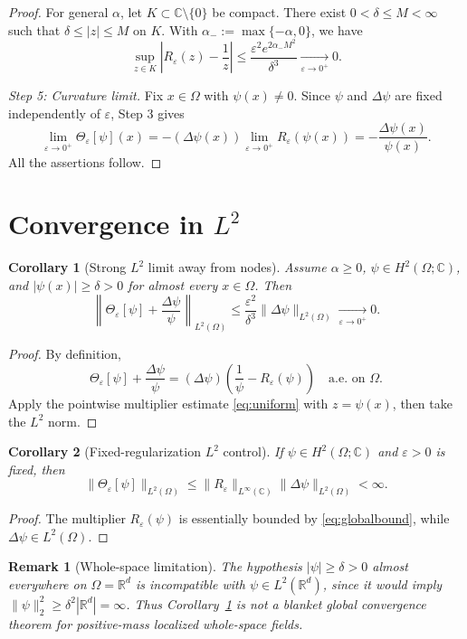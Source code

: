 \documentclass[11pt]{article}
\newtheorem{corollary}{Corollary}
\newtheorem{remark}{Remark}
\newcommand{\C}{\mathbb{C}}
\newcommand{\R}{\mathbb{R}}
\newcommand{\eps}{\varepsilon}
\newcommand{\Reps}{R_{\eps}}
\newcommand{\Thetaeps}{\Theta_{\eps}}
\newcommand{\aMinus}{\alpha_{-}}
\begin{document}
\begin{proof}
For general $\alpha$, let $K\subset\C\setminus\{0\}$ be compact.
There exist $0<\delta\le M<\infty$ such that
$\delta\le|z|\le M$ on $K$. With
$\aMinus:=\max\{-\alpha,0\}$, we have
\[
\sup_{z\in K}
\left|\Reps(z)-\frac1z\right|
\le\frac{\eps^2e^{2\aMinus M^2}}{\delta^3}
\xrightarrow[\eps\to0^+]{}0.
\]

\emph{Step 5: Curvature limit.}
Fix $x\in\Omega$ with $\psi(x)\ne0$. Since $\psi$ and
$\Delta\psi$ are fixed independently of $\eps$, Step 3 gives
\[
\lim_{\eps\to0^+}\Thetaeps[\psi](x)
=-(\Delta\psi(x))\lim_{\eps\to0^+}\Reps(\psi(x))
=-\frac{\Delta\psi(x)}{\psi(x)}.
\]
All the assertions follow.
\end{proof}

\section{Convergence in $L^2$}

\begin{corollary}[Strong $L^2$ limit away from nodes]
\label{cor:l2}
Assume $\alpha\ge0$,
$\psi\in H^2(\Omega;\C)$, and
$|\psi(x)|\ge\delta>0$ for almost every $x\in\Omega$.
Then
\begin{equation}\label{eq:l2}
\left\|\Thetaeps[\psi]
+\frac{\Delta\psi}{\psi}\right\|_{L^2(\Omega)}
\le\frac{\eps^2}{\delta^3}
\|\Delta\psi\|_{L^2(\Omega)}
\xrightarrow[\eps\to0^+]{}0.
\end{equation}
\end{corollary}

\begin{proof}
By definition,
\[
\Thetaeps[\psi]+\frac{\Delta\psi}{\psi}
=(\Delta\psi)\left(\frac1\psi-\Reps(\psi)\right)
\quad\text{a.e. on }\Omega.
\]
Apply the pointwise multiplier estimate \eqref{eq:uniform} with
$z=\psi(x)$, then take the $L^2$ norm.
\end{proof}

\begin{corollary}[Fixed-regularization $L^2$ control]
If $\psi\in H^2(\Omega;\C)$ and $\eps>0$ is fixed, then
\[
\|\Thetaeps[\psi]\|_{L^2(\Omega)}
\le\|\Reps\|_{L^\infty(\C)}
\|\Delta\psi\|_{L^2(\Omega)}<\infty.
\]
\end{corollary}

\begin{proof}
The multiplier $\Reps(\psi)$ is essentially bounded by
\eqref{eq:globalbound}, while $\Delta\psi\in L^2(\Omega)$.
\end{proof}

\begin{remark}[Whole-space limitation]
The hypothesis $|\psi|\ge\delta>0$ almost everywhere on
$\Omega=\R^d$ is incompatible with $\psi\in L^2(\R^d)$, since it
would imply $\|\psi\|_2^2\ge\delta^2|\R^d|=\infty$.
Thus Corollary~\ref{cor:l2} is not a blanket global convergence
theorem for positive-mass localized whole-space fields.
\end{remark}
\end{document}
